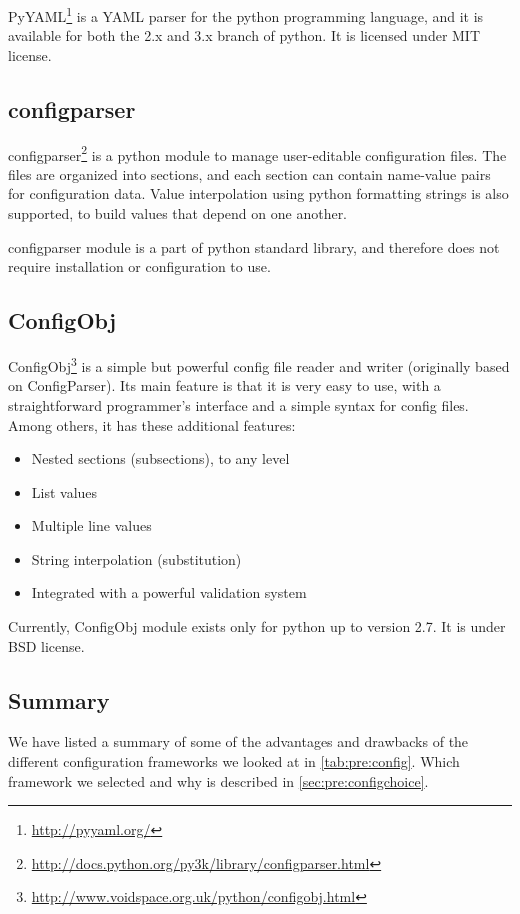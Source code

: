 PyYAML\footnote{\url{http://pyyaml.org/}} is a YAML parser for the python
programming language, and it is available for both the 2.x and 3.x branch of
python. It is licensed under MIT license.

\subsection{configparser}
configparser\footnote{\url{http://docs.python.org/py3k/library/configparser.html}}
is a python module to manage user-editable configuration files. The
files are organized into sections, and each section can contain name-value
pairs for configuration data. Value interpolation using python formatting
strings is also supported, to build values that depend on one another.

configparser module is a part of python standard library, and therefore does
not require installation or configuration to use.

\subsection{ConfigObj}
ConfigObj\footnote{\url{http://www.voidspace.org.uk/python/configobj.html}} is
a simple but powerful config file reader and writer (originally based on
ConfigParser). Its main feature is that it is very easy to use, with a
straightforward programmer's interface and a simple syntax for config files.
Among others, it has these additional features:
\begin{itemize}
	\item Nested sections (subsections), to any level
	\item List values
	\item Multiple line values
	\item String interpolation (substitution)
	\item Integrated with a powerful validation system
\end{itemize}

\noindent Currently, ConfigObj module exists only for python up to version
2.7. It is under BSD license.

\subsection{Summary}
We have listed a summary of some of the advantages and drawbacks of the
different configuration frameworks we looked at in \autoref{tab:pre:config}.
Which framework we selected and why is described in
\autoref{sec:pre:configchoice}.

